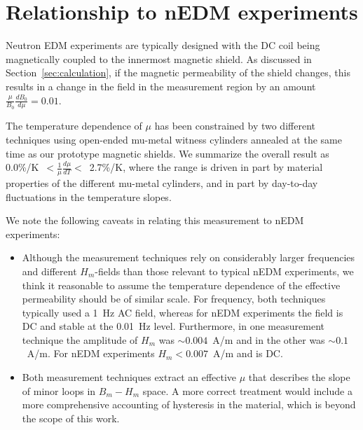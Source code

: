 





\section{Relationship to nEDM experiments\label{sec:relationship}}

Neutron EDM experiments are typically designed with the DC coil being
magnetically coupled to the innermost magnetic shield.  As discussed
in Section~\ref{sec:calculation}, if the magnetic permeability of the
shield changes, this results in a change in the field in the
measurement region by an amount
$\frac{\mu}{B_0}\frac{dB_0}{d\mu}=0.01$.

The temperature dependence of $\mu$ has been constrained by two
different techniques using open-ended mu-metal witness cylinders
annealed at the same time as our prototype magnetic shields.  We
summarize the overall result as
0.0\%/K~$<\frac{1}{\mu}\frac{d\mu}{dT}<$~2.7\%/K, where the range is
driven in part by material properties of the different mu-metal
cylinders, and in part by day-to-day fluctuations in the temperature
slopes.



We note the following caveats in relating this measurement to nEDM
experiments:
\begin{itemize}
\item Although the measurement techniques rely on considerably larger
  frequencies and different $H_m$-fields than those relevant to
  typical nEDM experiments, we think it reasonable to assume the
  temperature dependence of the effective permeability should be of
  similar scale.  For frequency, both techniques typically used a 1~Hz
  AC field, whereas for nEDM experiments the field is DC and stable at
  the 0.01~Hz level.  Furthermore, in one measurement technique the
  amplitude of $H_m$ was $\sim 0.004$~A/m and in the other was $\sim
  0.1$~A/m.  For nEDM experiments $H_m<0.007$~A/m and is DC.
\item Both measurement techniques extract an effective $\mu$ that
  describes the slope of minor loops in $B_m-H_m$ space.  A more
  correct treatment would include a more comprehensive accounting of
  hysteresis in the material, which is beyond the scope of this work.
\end{itemize}

